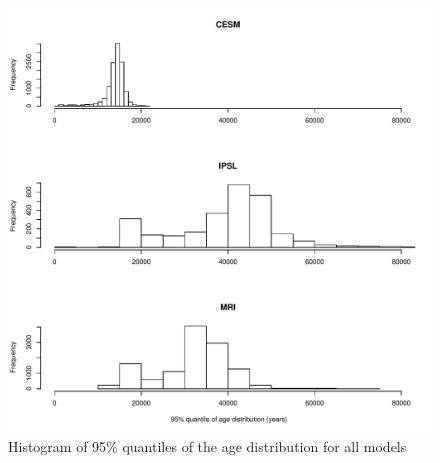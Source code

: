 \documentclass{agujournal}
\begin{document}
\begin{figure}[t]
   \centering
   \includegraphics{Figures/corrP95ESMs} %
   \caption{Histogram of 95\% quantiles of the age distribution for all models}
\end{figure}
\end{document}
